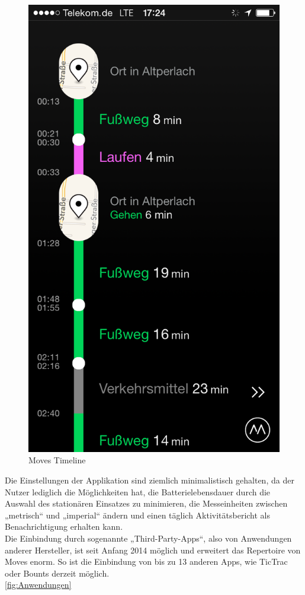 \begin{figure}[h]
\centering
\includegraphics[scale=0.3]{images/moves_app_screenshot.png}
\caption{Moves Timeline \cite{fig:Timeline}}
\label{fig:Timeline}
\end{figure}

Die Einstellungen der Applikation sind ziemlich minimalistisch gehalten, da der Nutzer lediglich die Möglichkeiten hat, die Batterielebensdauer durch die Auswahl des stationären Einsatzes zu minimieren, die Messeinheiten zwischen „metrisch“ und „imperial“ ändern und einen täglich Aktivitätsbericht als Benachrichtigung erhalten kann. 
\\
Die Einbindung durch sogenannte „Third-Party-Apps“, also von Anwendungen anderer Hersteller, ist seit Anfang 2014 möglich und erweitert das Repertoire von Moves enorm. 
So ist die Einbindung von bis zu 13 anderen Apps, wie TicTrac oder Bounts derzeit möglich.  
\\
\ref{fig:Anwendungen}

